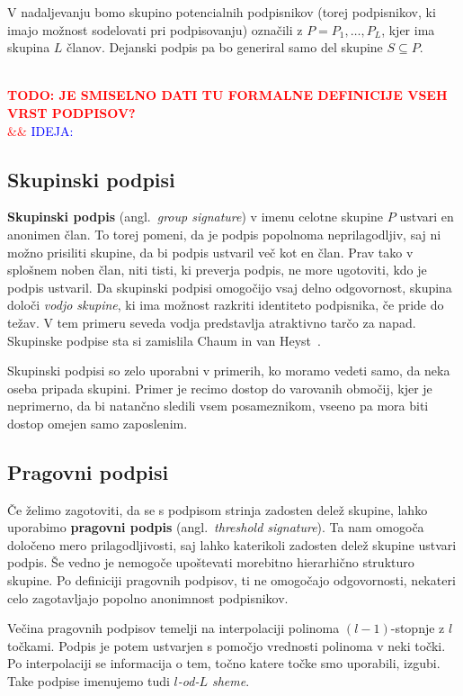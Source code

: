 \documentclass[isrm2, tisk]{fmfdelo}
\newcommand{\todo}[2][]{%
    \textcolor{red}{%
        \\ \textbf{\uppercase{todo: #2}}%
        \\%
        \ifx&#1&%
        \else%
            \textcolor{blue}{\uppercase{ideja:} #1}%
            \\%
        \fi%
    }%
}
\begin{document}
V nadaljevanju bomo skupino potencialnih podpisnikov (torej podpisnikov, ki imajo možnost sodelovati pri 
podpisovanju) označili z $P = P_1, \dots, P_L$, kjer ima skupina $L$ članov. Dejanski podpis pa bo 
generiral samo del skupine $S \subseteq P$.

\todo{je smiselno dati tu formalne definicije vseh vrst podpisov?}

\subsection{Skupinski podpisi}
\textbf{Skupinski podpis} (angl.\ \textit{group signature}) v imenu celotne skupine $P$ ustvari en 
anonimen član. To torej pomeni, da je podpis popolnoma neprilagodljiv, saj ni možno prisiliti skupine,
da bi podpis ustvaril več kot en član. Prav tako v splošnem noben član, niti tisti, ki preverja podpis,
ne more ugotoviti, kdo je podpis ustvaril. Da skupinski podpisi omogočijo vsaj delno odgovornost, 
skupina določi \textit{vodjo skupine}, ki ima možnost razkriti identiteto podpisnika, če pride do 
težav. V tem primeru seveda vodja predstavlja atraktivno tarčo za napad. Skupinske podpise sta si
zamislila Chaum in van Heyst~\cite{chaum1991group}.

\begin{primer}
    Skupinski podpisi so zelo uporabni v primerih, ko moramo vedeti samo, da neka oseba pripada skupini.
    Primer je recimo dostop do varovanih območij, kjer je neprimerno, da bi natančno sledili vsem
    posameznikom, vseeno pa mora biti dostop omejen samo zaposlenim.
\end{primer}

\subsection{Pragovni podpisi}
Če želimo zagotoviti, da se s podpisom strinja zadosten delež skupine, lahko uporabimo \textbf{pragovni 
podpis} (angl.\ \textit{threshold signature}). Ta nam omogoča določeno mero prilagodljivosti, saj lahko 
katerikoli zadosten delež skupine ustvari podpis. Še vedno je nemogoče upoštevati morebitno hierarhično
strukturo skupine. Po definiciji pragovnih podpisov, ti ne omogočajo odgovornosti, nekateri celo
zagotavljajo popolno anonimnost podpisnikov.

Večina pragovnih podpisov temelji na interpolaciji polinoma $(l - 1)$-stopnje z $l$ točkami. Podpis je 
potem ustvarjen s pomočjo vrednosti polinoma v neki točki. Po interpolaciji se informacija o tem, točno 
katere točke smo uporabili, izgubi. Take podpise imenujemo tudi \textit{$l$-od-$L$ sheme}.
\end{document}
